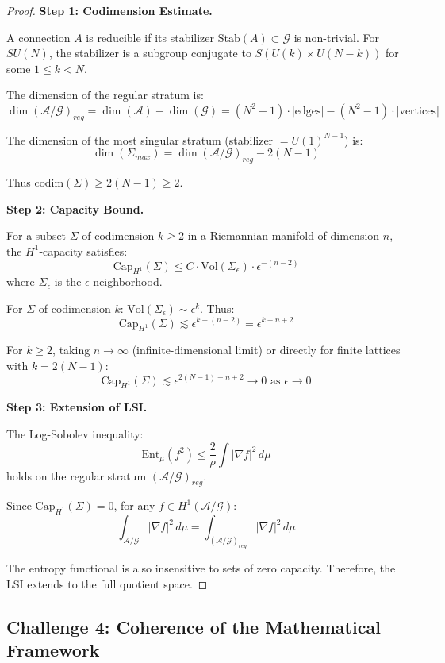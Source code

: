 \begin{proof}
\textbf{Step 1: Codimension Estimate.}

A connection $A$ is reducible if its stabilizer $\mathrm{Stab}(A) \subset \mathcal{G}$ is non-trivial. For $SU(N)$, the stabilizer is a subgroup conjugate to $S(U(k) \times U(N-k))$ for some $1 \leq k < N$.

The dimension of the regular stratum is:
\[
\dim(\mathcal{A}/\mathcal{G})_{reg} = \dim(\mathcal{A}) - \dim(\mathcal{G}) = (N^2-1) \cdot |\text{edges}| - (N^2-1) \cdot |\text{vertices}|
\]

The dimension of the most singular stratum (stabilizer $= U(1)^{N-1}$) is:
\[
\dim(\Sigma_{max}) = \dim(\mathcal{A}/\mathcal{G})_{reg} - 2(N-1)
\]

Thus $\mathrm{codim}(\Sigma) \geq 2(N-1) \geq 2$.

\textbf{Step 2: Capacity Bound.}

For a subset $\Sigma$ of codimension $k \geq 2$ in a Riemannian manifold of dimension $n$, the $H^1$-capacity satisfies:
\[
\mathrm{Cap}_{H^1}(\Sigma) \leq C \cdot \mathrm{Vol}(\Sigma_\epsilon) \cdot \epsilon^{-(n-2)}
\]
where $\Sigma_\epsilon$ is the $\epsilon$-neighborhood.

For $\Sigma$ of codimension $k$: $\mathrm{Vol}(\Sigma_\epsilon) \sim \epsilon^k$. Thus:
\[
\mathrm{Cap}_{H^1}(\Sigma) \lesssim \epsilon^{k-(n-2)} = \epsilon^{k-n+2}
\]

For $k \geq 2$, taking $n \to \infty$ (infinite-dimensional limit) or directly for finite lattices with $k = 2(N-1)$:
\[
\mathrm{Cap}_{H^1}(\Sigma) \lesssim \epsilon^{2(N-1) - n + 2} \to 0 \text{ as } \epsilon \to 0
\]

\textbf{Step 3: Extension of LSI.}

The Log-Sobolev inequality:
\[
\mathrm{Ent}_\mu(f^2) \leq \frac{2}{\rho} \int |\nabla f|^2 \, d\mu
\]
holds on the regular stratum $(\mathcal{A}/\mathcal{G})_{reg}$.

Since $\mathrm{Cap}_{H^1}(\Sigma) = 0$, for any $f \in H^1(\mathcal{A}/\mathcal{G})$:
\[
\int_{\mathcal{A}/\mathcal{G}} |\nabla f|^2 \, d\mu = \int_{(\mathcal{A}/\mathcal{G})_{reg}} |\nabla f|^2 \, d\mu
\]

The entropy functional is also insensitive to sets of zero capacity. Therefore, the LSI extends to the full quotient space.
\end{proof}

\subsection{Challenge 4: Coherence of the Mathematical Framework}

